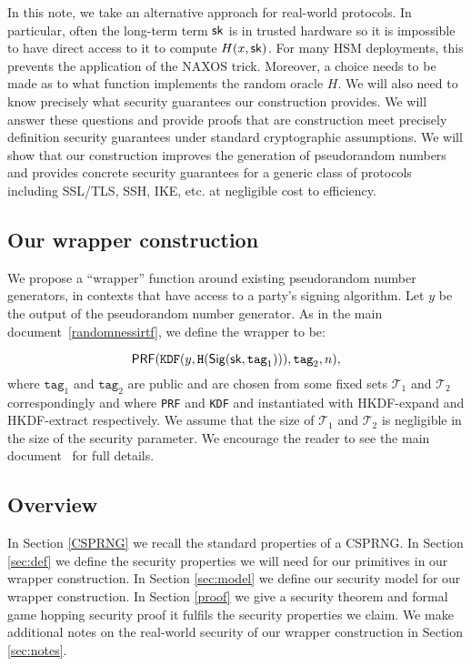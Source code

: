 \documentclass{article}
\begin{document}
In this note, we take an alternative approach for real-world protocols.
In particular, often the long-term term $\mathsf{sk}$ is in trusted hardware so
it is impossible to have direct access to it to compute $H(x, \mathsf{sk})$.
For many HSM deployments, this prevents the application of the NAXOS
trick.
Moreover, a choice needs to be made as to what function implements the
random oracle $H$. We will also need to know precisely what security
guarantees our construction provides.  We will answer these questions
and provide proofs that are construction meet precisely definition
security guarantees under standard cryptographic assumptions. We will
show that our construction improves the generation of pseudorandom
numbers and provides concrete security guarantees for a generic class of
protocols including SSL/TLS, SSH, IKE, etc. at negligible cost to efficiency. 

\subsection*{Our wrapper construction}

We propose a ``wrapper'' function around existing
pseudorandom number generators, in contexts that have access to a
party's signing algorithm. Let $y$ be the output of the pseudorandom
number generator. As in the main document~\ref{randomnessirtf}, we define the wrapper to be:

$$
\mathsf{PRF}(\texttt{KDF}(y, \texttt{H}(\mathsf{Sig} (\mathsf{sk}, \texttt{tag}_1))), \texttt{tag}_2, n),
$$
where $\texttt{tag}_1$ and $\texttt{tag}_2$ are public and are chosen
from some fixed sets $\mathcal{T}_1$ and $\mathcal{T}_2$ correspondingly
and where \texttt{PRF} and \texttt{KDF} and instantiated with
HKDF-expand and HKDF-extract respectively. We assume that the size of
$\mathcal{T}_1$ and $\mathcal{T}_2$ is negligible in the size of the
security parameter.
We encourage the reader to see the main document~\cite{randomnessirtf} for full details.

\subsection*{Overview}
In Section \ref{CSPRNG} we recall the standard properties of a CSPRNG. In Section \ref{sec:def} we define the security properties we will need for our primitives in our wrapper construction. In Section \ref{sec:model} we define our security model for our wrapper construction. In Section \ref{proof} we give a security theorem and formal game hopping security proof it fulfils the security properties we claim. We make additional notes on the real-world security of our wrapper construction in Section \ref{sec:notes}.
\end{document}
